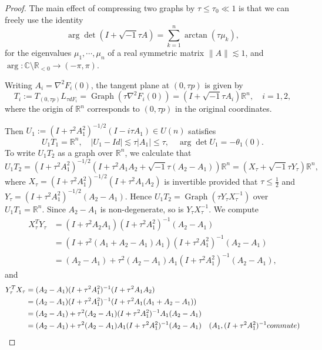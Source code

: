 \documentclass[10pt,a4paper]{amsart}
\newcommand{\C}{\mathbb{C}}
\newcommand{\R}{\mathbb{R}}
\begin{document}
   \begin{proof} The main effect of compressing two graphs by $\tau\leqslant \tau_0\ll1$ is that we can freely use the identity 
   $$\arg \det(I+\sqrt{-1}\tau A)=\sum_{k=1}^n\arctan (\tau \mu_k), $$
for the eigenvalues $\mu_1,\cdots,\mu_n$ of a real symmetric matrix $\|A\|\lesssim 1$, and $\arg :\C\setminus \R_{<0}\to (-\pi,\pi)$.  
   
       Writing $A_i=\nabla^2F_i(0)$, the tangent plane at $(0,\tau p)$ is given by
       $$T_i:=T_{(0,\tau p)}L_{\tau dF_i}=\operatorname{Graph}(\tau\nabla^2F_i(0))=(I+\sqrt{-1}\tau A_i)\R^n,\quad i=1,2, $$
       where the origin of $\R^n$ corresponds to $(0,\tau p)$ in the original coordinates. 
       
       Then $U_1:=(I+\tau^2 A_1^2)^{-1/2}(I-i\tau A_1)\in U(n)$ satisfies
       $$U_1T_1=\R^n,\quad |U_1-Id|\lesssim \tau|A_1|\leqslant\tau,\quad \arg \det U_1=-\theta_{1}(0).$$
       To write $U_1T_2$ as a graph over $\R^n$, we calculate that 
       $$U_1T_2=(I+\tau^2A_1^2)^{-1/2}(I+\tau^2A_1A_2+\sqrt{-1}\tau (A_2-A_1))\R^n=(X_{\tau}+\sqrt{-1}\tau Y_\tau)\R^n,$$
       where $X_\tau=(I+\tau^2A_1^2)^{-1/2}(I+\tau^2A_1A_2)$ is invertible provided that $\tau\leqslant \frac{1}{2}$ and $Y_\tau=(I+\tau^2A_1^2)^{-1/2}(A_2-A_1)$. Hence $U_1T_2=\operatorname{Graph}(\tau Y_{\tau}X_{\tau}^{-1})$ over $U_1T_1=\R^n$. Since $A_2-A_1$ is non-degenerate, so is $Y_{\tau}X_{\tau}^{-1}$. We compute 
        \begin{equation}
        \begin{aligned}
            \label{eqn:symmetricgraphmatrix}
         X_\tau^TY_\tau&=(I+\tau^2A_2A_1)(I+\tau^{2}A_1^{2})^{-1}(A_2-A_1)
               \\&=(I+\tau^2(A_1+A_2-A_1)A_1)(I+\tau^2A_1^2)^{-1}(A_2-A_1)
               \\&=(A_2-A_1)+\tau^2(A_2-A_1)A_1(I+\tau^2A_1^2)^{-1}(A_2-A_1),
            \end{aligned}
        \end{equation}
       and 
       \begin{equation}
           \begin{aligned}
               Y_\tau^T X_\tau&=(A_2-A_1)(I+\tau^2A_1^2)^{-1}(I+\tau^2A_1A_2)
               \\&=(A_2-A_1)(I+\tau^2A_1^2)^{-1}(I+\tau^2A_1(A_1+A_2-A_1))
               \\&=(A_2-A_1)+\tau^2(A_2-A_1)(I+\tau^2A_1^2)^{-1}A_1(A_2-A_1)
               \\&=(A_2-A_1)+\tau^2(A_2-A_1)A_1(I+\tau^2A_1^2)^{-1}(A_2-A_1)\quad (A_1,(I+\tau^2A_1^2)^{-1} \textnormal{commute})

\end{aligned}
\end{equation}
\end{proof}
\end{document}
